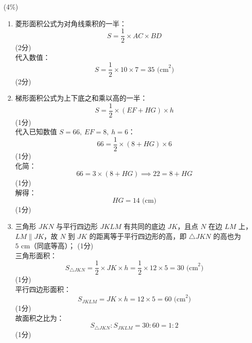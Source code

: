 \documentclass[12pt,a4paper]{exam-zh}
\begin{document}
\begin{question}[points = 12]
\begin{enumerate}[label=(\alph*)]
        \begin{center}
        \end{center} \hfill (4\%)
    \end{enumerate}
\end{question}

\begin{solution}
    \begin{enumerate}[label=(\alph*)]
        \item 菱形面积公式为对角线乘积的一半：
        $$S = \frac{1}{2}\times AC \times BD$$ \hfill (2分) \\
        代入数值：
        $$S = \frac{1}{2}\times 10 \times 7 = 35 \text{ (cm}^2\text{)}$$ \hfill (2分)

        \item 梯形面积公式为上下底之和乘以高的一半：
        $$S = \frac{1}{2}\times(EF+HG)\times h$$ \hfill (1分) \\
        代入已知数值 $S=66,\ EF=8,\ h=6$：
        $$66 = \frac{1}{2}\times(8+HG)\times 6$$ \hfill (1分) \\
        化简：
        $$66 = 3\times(8+HG) \implies 22 = 8+HG$$ \hfill (1分) \\
        解得：
        $$HG = 14 \text{ (cm)}$$ \hfill (1分)

        \item 三角形 $JKN$ 与平行四边形 $JKLM$ 有共同的底边 $JK$，且点 $N$ 在边 $LM$ 上，$LM \parallel JK$，故 $N$ 到 $JK$ 的距离等于平行四边形的高，即 $\triangle JKN$ 的高也为 $5\text{ cm}$（同底等高）； \hfill (1分) \\
        三角形面积：
        $$S_{\triangle JKN} = \frac{1}{2}\times JK \times h = \frac{1}{2}\times 12\times 5 = 30 \text{ (cm}^2\text{)}$$ \hfill (1分) \\
        平行四边形面积：
        $$S_{JKLM} = JK\times h = 12\times 5 = 60 \text{ (cm}^2\text{)}$$ \hfill (1分) \\
        故面积之比为：
        $$S_{\triangle JKN} : S_{JKLM} = 30:60 = 1:2$$ \hfill (1分)
    \end{enumerate}
\end{solution}
\newpage
\end{document}
